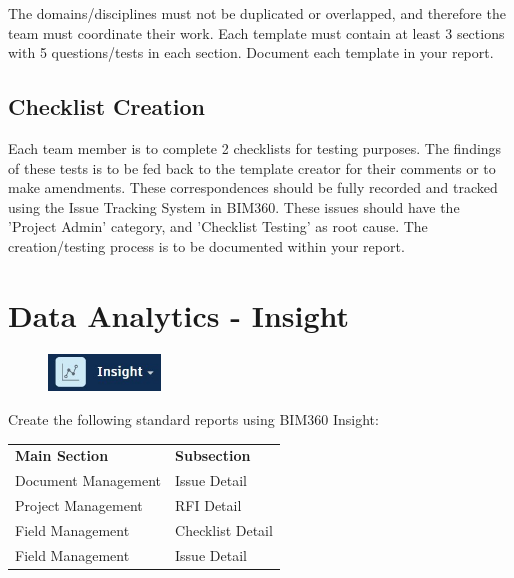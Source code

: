 The domains/disciplines must not be duplicated or overlapped, and therefore the team must coordinate their work.  Each template must contain at least 3 sections with 5 questions/tests in each section.  Document each template in your report.

\subsection{Checklist Creation}

Each team member is to complete 2 checklists for testing purposes.  The findings of these tests is to be fed back to the template creator for their comments or to make amendments.  These correspondences should be fully recorded and tracked using the Issue Tracking System in BIM360. These issues should have the 'Project Admin' category, and 'Checklist Testing' as root cause.  The creation/testing process is to be documented within your report.  



\section{Data Analytics - Insight}

\begin{figure}[h!t]
	\includegraphics[height=1.0cm]{RevitAssets/insight}
	\label{fig:insight}
\end{figure}




Create the following standard reports using BIM360 Insight: 

\begin{table}[h!]
	\begin{center}
		\begin{tabular}{p{5cm}  p{5cm} }
			\toprule
			\textbf{Main Section} & \textbf{Subsection} \\ 
			\cmidrule(r){1-1}\cmidrule(lr){2-2}
			Document Management & Issue Detail \\
			Project Management & RFI Detail \\
			Field Management & Checklist Detail \\
			Field Management & Issue Detail \\
			\bottomrule
		\end{tabular}
		\label{tbl:markSchemeAsmt2}
	\end{center}
\end{table}


